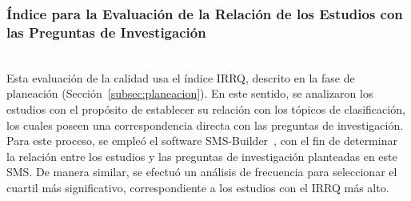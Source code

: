 \subsubsection{Índice para la Evaluación de la Relación de los Estudios con las Preguntas de Investigación}
\mbox{}\\
Esta evaluación de la calidad usa el índice IRRQ, descrito en la fase de planeación (Sección~\ref{subsec:planeacion}). En este sentido, se analizaron los estudios con el propósito de establecer su relación con los tópicos de clasificación, los cuales poseen una correspondencia directa con las preguntas de investigación.\\
Para este proceso, se empleó el software SMS-Builder~\cite{candela2020smsbuilder}, con el fin de determinar la relación entre los estudios y las preguntas de investigación planteadas en este SMS. De manera similar, se efectuó un análisis de frecuencia para seleccionar el cuartil más significativo, correspondiente a los estudios con el IRRQ más alto.